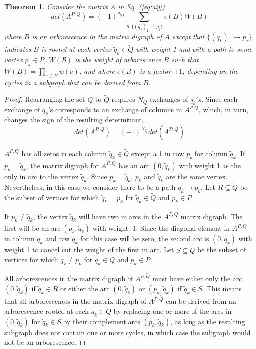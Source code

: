 \documentclass[10pt,a4paper]{amsart}
\newtheorem{theorem}{Theorem}
\begin{document}
\begin{theorem}
Consider the matrix $A$ in Eq. (\ref{eq:aij}).
\begin{equation}
det(A^{P, Q}) = \left(-1\right)^{N_Q} \sum_{B: \{(\tilde{q_k})_1 \to p_j\}}
\epsilon(B) W(B)
\label{eq:detapq}
\end{equation}
where $B$ is an arborescence in the matrix digraph of
$A$ except that $\{(\tilde{q_k})_1 \to p_j\}$
indicates $B$ is rooted at each vertex
$\tilde{q}_k \in \tilde{Q}$ with weight 1 and with a path to some
vertex $p_j \in P$, $W(B)$ is the weight of arborescence $B$ such that $W(B) = \prod_{e \in B} w(e)$, and where $\epsilon(B)$ is a factor $\pm 1$, depending
on the cycles in a subgraph that can be derived from $B$.
\label{theorem:reduced}
\end{theorem}

\begin{proof}
Rearranging the set $Q$ to $\tilde{Q}$ requires $N_Q$
exchanges of ${q_k}'s$.
Since each exchange of $q_k$'s
corresponds to an exchange of columns in $A^{P, Q}$, which, in turn, changes
the sign of the resulting determinant,
\begin{equation}
det(A^{P, Q}) = \left(-1\right)^{N_Q} det(A^{P, \tilde{Q}})
\label{eq:detapqp}
\end{equation}

$A^{P, \tilde{Q}}$ has all zeros in each column $\tilde{q}_k \in \tilde{Q}$
except a 1 in row
$p_k$ for column $\tilde{q}_k$.
If $p_k = \tilde{q}_k$, the matrix digraph for $A^{P, \tilde{Q}}$
has an arc $(0, \tilde{q}_k)$ with weight 1 as the only in arc
to the vertex $\tilde{q}_k$.  Since $p_k = \tilde{q}_k$, $p_k$ and
$\tilde{q}_k$ are the same vertex.  Nevertheless, in this case we consider
there to be a path $\tilde{q}_k \to p_k$.
Let $R \subseteq \tilde{Q}$ be the subset of vertices for which
$\tilde{q}_k = p_k$ for $\tilde{q}_k \in \tilde{Q}$ and $p_k \in P$.

If $p_k \ne \tilde{q}_k$, the vertex $\tilde{q}_k$
will have two in arcs in the $A^{P, \tilde{Q}}$ matrix digraph.
The first will be an arc $(p_k, \tilde{q}_k)$ with weight -1.
Since the diagonal element in $A^{P, \tilde{Q}}$ 
in column $\tilde{q}_k$ and row $\tilde{q}_k$ for this case will be zero,
the second arc is $(0, \tilde{q}_k)$ with weight 1 to cancel out the
weight of the first in arc.
Let $S \subseteq \tilde{Q}$ be the subset of vertices for which
$\tilde{q}_k \ne p_k$ for $\tilde{q}_k \in \tilde{Q}$ and $p_k \in P$.

All arborescences in the matrix digraph of $A^{P, \tilde{Q}}$ must have
either only the arc $(0, \tilde{q}_k)$ if $\tilde{q}_k \in R$ or either
the arc $(0, \tilde{q}_k)$ or $(p_k, \tilde{q}_k)$
if $\tilde{q}_k \in S$.  This means that all arborescences
in the matrix digraph of $A^{P, \tilde{Q}}$ can be derived from an arborescence
rooted at each $\tilde{q}_k \in \tilde{Q}$ by replacing one or more
of the arcs in $(0, \tilde{q}_k)$ for $\tilde{q}_k \in S$ by their
complement arcs $(p_k, \tilde{q}_k)$, as long as the resulting subgraph
does not contain one or more cycles, in which case the subgraph would not
be an arborescence.


\end{proof}
\end{document}
